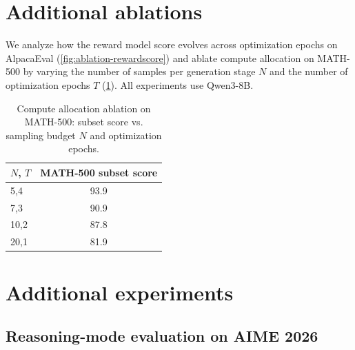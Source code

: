 \documentclass[11pt]{article}
\theoremstyle{plain}
\theoremstyle{definition}
\theoremstyle{remark}
\begin{document}
\section{Additional ablations}
\label{app:ablation-more}
\noindent We analyze how the reward model score evolves across optimization epochs on AlpacaEval (\cref{fig:ablation-rewardscore}) and ablate compute allocation on MATH-500 by varying the number of samples per generation stage \(N\) and the number of optimization epochs \(T\) (\cref{tab:ablation-N-epochs}). All experiments use Qwen3-8B.


\begin{table}[h]
\centering
\begin{small}
\begin{sc}
\begin{tabular}{lc}
\toprule
\textbf{$N$, $T$} & \textbf{MATH-500 subset score} \\
\midrule
5,4 & 93.9 \\
7,3 & 90.9 \\
10,2 & 87.8 \\
20,1 & 81.9 \\
\bottomrule
\end{tabular}
\end{sc}
\end{small}
\caption{Compute allocation ablation on MATH-500: subset score vs. sampling budget \(N\) and optimization epochs.}
\label{tab:ablation-N-epochs}
\end{table}


\begingroup
\section{Additional experiments}
\label{app:additional-experiments}

\subsection{Reasoning-mode evaluation on AIME 2026}
\end{document}
